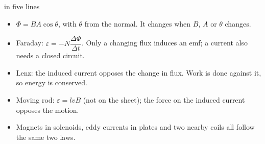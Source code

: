 \begin{summarybox}{ in five lines}
\begin{itemize}
  \item $\Phi = BA\cos\theta$, with $\theta$ from the normal. It changes when $B$,
        $A$ or $\theta$ changes.
  \item Faraday: $\varepsilon = -N\dfrac{\Delta\Phi}{\Delta t}$. Only a changing flux
        induces an emf; a current also needs a closed circuit.
  \item Lenz: the induced current opposes the change in flux. Work is done against
        it, so energy is conserved.
  \item Moving rod: $\varepsilon = lvB$ (not on the sheet); the force on the
        induced current opposes the motion.
  \item Magnets in solenoids, eddy currents in plates and two nearby coils all
        follow the same two laws.
\end{itemize}
\end{summarybox}
